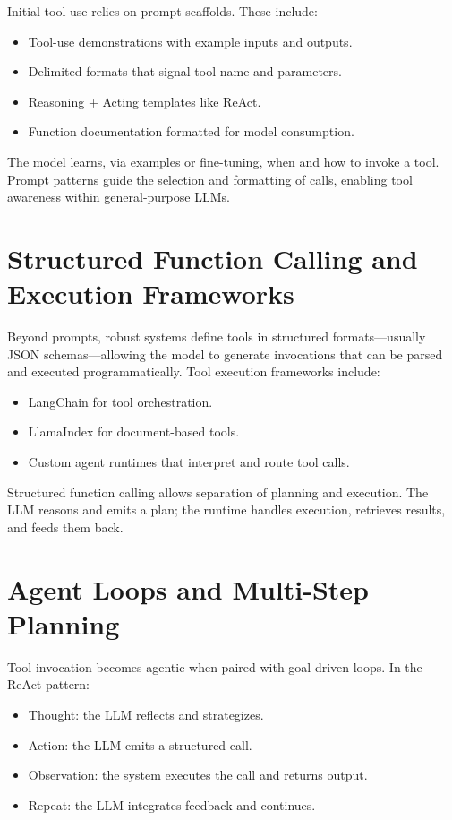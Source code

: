 \documentclass{book}
\begin{document}
Initial tool use relies on prompt scaffolds. These include:

\begin{itemize}
  \item Tool-use demonstrations with example inputs and outputs.
  \item Delimited formats that signal tool name and parameters.
  \item Reasoning + Acting templates like ReAct.
  \item Function documentation formatted for model consumption.
\end{itemize}

The model learns, via examples or fine-tuning, when and how to invoke a tool. Prompt patterns guide the selection and formatting of calls, enabling tool awareness within general-purpose LLMs.

\section{Structured Function Calling and Execution Frameworks}

Beyond prompts, robust systems define tools in structured formats—usually JSON schemas—allowing the model to generate invocations that can be parsed and executed programmatically. Tool execution frameworks include:

\begin{itemize}
  \item LangChain for tool orchestration.
  \item LlamaIndex for document-based tools.
  \item Custom agent runtimes that interpret and route tool calls.
\end{itemize}

Structured function calling allows separation of planning and execution. The LLM reasons and emits a plan; the runtime handles execution, retrieves results, and feeds them back.

\section{Agent Loops and Multi-Step Planning}

Tool invocation becomes agentic when paired with goal-driven loops. In the ReAct pattern:

\begin{itemize}
  \item Thought: the LLM reflects and strategizes.
  \item Action: the LLM emits a structured call.
  \item Observation: the system executes the call and returns output.
  \item Repeat: the LLM integrates feedback and continues.
\end{itemize}
\end{document}
